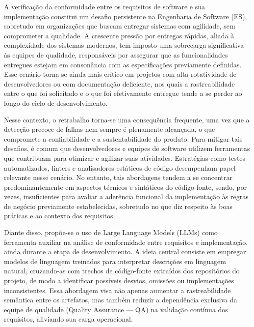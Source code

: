 \label{cap:introducao}

A verificação da conformidade entre os requisitos de software e sua implementação constitui um desafio persistente na Engenharia de Software (ES), sobretudo em organizações que buscam entregar sistemas com agilidade, sem comprometer a qualidade. A crescente pressão por entregas rápidas, aliada à complexidade dos sistemas modernos, tem imposto uma sobrecarga significativa às equipes de qualidade, responsáveis por assegurar que as funcionalidades entregues estejam em consonância com as especificações previamente definidas. Esse cenário torna-se ainda mais crítico em projetos com alta rotatividade de desenvolvedores ou com documentação deficiente, nos quais a rastreabilidade entre o que foi solicitado e o que foi efetivamente entregue tende a se perder ao longo do ciclo de desenvolvimento.

Nesse contexto, o retrabalho torna-se uma consequência frequente, uma vez que a detecção precoce de falhas nem sempre é plenamente alcançada, o que compromete a confiabilidade e a sustentabilidade do produto. Para mitigar tais desafios, é comum que desenvolvedores e equipes de software utilizem ferramentas que contribuam para otimizar e agilizar suas atividades. Estratégias como testes automatizados, linters e analisadores estáticos de código desempenham papel relevante nesse cenário. No entanto, tais abordagens tendem a se concentrar predominantemente em aspectos técnicos e sintáticos do código-fonte, sendo, por vezes, insuficientes para avaliar a aderência funcional da implementação às regras de negócio previamente estabelecidas, sobretudo no que diz respeito às boas práticas e ao contexto dos requisitos.

Diante disso, propõe-se o uso de Large Language Models (LLMs) como ferramenta auxiliar na análise de conformidade entre requisitos e implementação, ainda durante a etapa de desenvolvimento. A ideia central consiste em empregar modelos de linguagem treinados para interpretar descrições em linguagem natural, cruzando-as com trechos de código-fonte extraídos dos repositórios do projeto, de modo a identificar possíveis desvios, omissões ou implementações inconsistentes. Essa abordagem visa não apenas aumentar a rastreabilidade semântica entre os artefatos, mas também reduzir a dependência exclusiva da equipe de qualidade (Quality Assurance — QA) na validação contínua dos requisitos, aliviando sua carga operacional.

